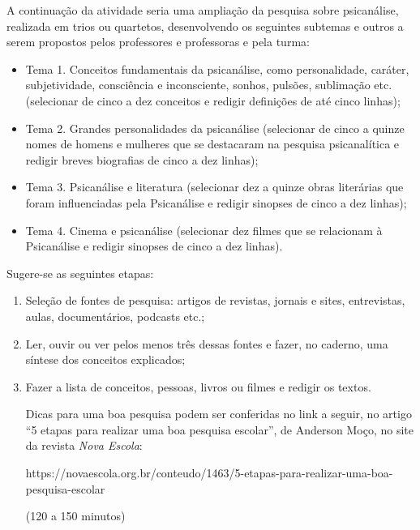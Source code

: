 \documentclass[12pt]{extarticle}
\begin{document}
{\begin{enumerate}
A continuação da atividade seria uma ampliação da pesquisa sobre
psicanálise, realizada em trios ou quartetos, desenvolvendo os seguintes
subtemas e outros a serem propostos pelos professores e professoras e
pela turma:

\begin{itemize}
\item
Tema 1. Conceitos fundamentais da psicanálise, como personalidade,
caráter, subjetividade, consciência e inconsciente, sonhos, pulsões,
sublimação etc. (selecionar de cinco a dez conceitos e redigir
definições de até cinco linhas);

\item
Tema 2. Grandes personalidades da psicanálise (selecionar de cinco a
quinze nomes de homens e mulheres que se destacaram na pesquisa
psicanalítica e redigir breves biografias de cinco a dez linhas);

\item
Tema 3. Psicanálise e literatura (selecionar dez a quinze obras
literárias que foram influenciadas pela Psicanálise e redigir sinopses
de cinco a dez linhas);

\item
Tema 4. Cinema e psicanálise (selecionar dez filmes que se relacionam à
Psicanálise e redigir sinopses de cinco a dez linhas).
\end{itemize}

Sugere-se as seguintes etapas:

\begin{enumerate}
\item
Seleção de fontes de pesquisa: artigos de revistas, jornais e sites,
entrevistas, aulas, documentários, podcasts etc.;

\item
Ler, ouvir ou ver pelos menos três dessas fontes e fazer, no caderno,
uma síntese dos conceitos explicados;

\item
Fazer a lista de conceitos, pessoas, livros ou filmes e redigir os
textos.

Dicas para uma boa pesquisa podem ser conferidas no link a seguir, no
artigo ``5 etapas para realizar uma boa pesquisa escolar'', de Anderson
Moço, no site da revista \emph{Nova Escola}:

https://novaescola.org.br/conteudo/1463/5-etapas-para-realizar-uma-boa-pesquisa-escolar

(120 a 150 minutos)
\end{enumerate}


\end{enumerate}}
\end{document}
